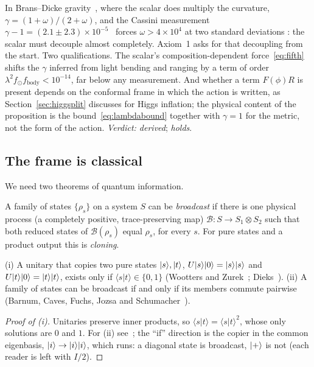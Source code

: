 In Brans--Dicke gravity~\cite{bd}, where the scalar does multiply the curvature, $\gamma=(1+\omega)/(2+\omega)$, and the Cassini
measurement $\gamma-1=(2.1\pm2.3)\times10^{-5}$~\cite{cassini} forces $\omega>4\times10^4$ at two standard deviations : the
scalar must decouple almost completely. Axiom~1 asks for that decoupling from the start. Two qualifications. The scalar's
composition-dependent force~\eqref{eq:fifth} shifts the $\gamma$ inferred from light bending and ranging by a term of order
$\lambda^2f_\odot f_{\text{body}}<10^{-14}$, far below any measurement. And whether a term $F(\phi)R$ is present depends on the conformal
frame in which the action is written, as Section~\ref{sec:higgsplit} discusses for Higgs inflation; the physical content of the
proposition is the bound~\eqref{eq:lambdabound} together with $\gamma=1$ for the metric, not the form of the action. \emph{Verdict:
derived}; \emph{holds}.


\subsection{The frame is classical}

We need two theorems of quantum information.

\begin{definition}[broadcasting]
A family of states $\{\rho_s\}$ on a system $S$ can be \emph{broadcast} if there is one physical process (a completely positive,
trace-preserving map) $\mathcal B:S\to S_1\otimes S_2$ such that both reduced states of $\mathcal B(\rho_s)$ equal $\rho_s$, for every $s$.
For pure states and a product output this is \emph{cloning}.
\end{definition}

\begin{lemma}\label{lem:nobroadcast}
(i) A unitary that copies two pure states $\lvert s\rangle,\lvert t\rangle$, $U\lvert s\rangle\lvert 0\rangle=\lvert s\rangle\lvert s\rangle$ and $U\lvert t\rangle\lvert 0\rangle=\lvert t\rangle\lvert t\rangle$, exists only if
$\langle s|t\rangle\in\{0,1\}$ (Wootters and Zurek~\cite{wz}; Dieks~\cite{dieks}). (ii) A family of states can be broadcast if and only if
its members commute pairwise (Barnum, Caves, Fuchs, Jozsa and Schumacher~\cite{barnum}). \tagP
\end{lemma}

\begin{proof}[Proof of (i)]
Unitaries preserve inner products, so $\langle s|t\rangle=\langle s|t\rangle^2$, whose only solutions are $0$ and $1$. For (ii) see~\cite{barnum};
the ``if'' direction is the copier in the common eigenbasis, $\lvert i\rangle\to\lvert i\rangle\lvert i\rangle$, which  runs: a diagonal state is broadcast,
$\lvert +\rangle$ is not (each reader is left with $I/2$).
\end{proof}

